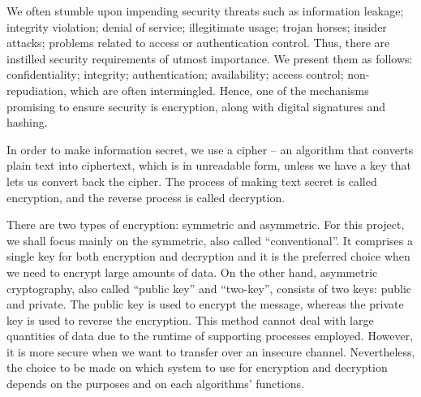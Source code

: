 We often stumble upon impending security threats such as information leakage; integrity violation; denial of service; illegitimate usage; trojan horses; insider attacks; problems related to access or authentication control. 
Thus, there are instilled security requirements of utmost importance. We present them as follows: confidentiality; integrity; authentication; availability; access control; non-repudiation, which are often intermingled. Hence, one of the mechanisms promising to ensure security is encryption, along with digital signatures and hashing. 

In order to make information secret, we use a cipher – an algorithm that converts plain text into ciphertext, which is in unreadable form, unless we have a key that lets us convert back the cipher. The process of making text secret is called encryption, and the reverse process is called decryption.

There are two types of encryption: symmetric and asymmetric. For this project, we shall focus mainly on the symmetric, also called “conventional”. It comprises a single key for both encryption and decryption and it is the preferred choice when we need to encrypt large amounts of data. On the other hand, asymmetric cryptography, also called “public key” and “two-key”, consists of two keys: public and private. The public key is used to encrypt the message, whereas the private key is used to reverse the encryption. This method cannot deal with large quantities of data due to the runtime of supporting processes employed. However, it is more secure when we want to transfer over an insecure channel. Nevertheless, the choice to be made on which system to use for encryption and decryption depends on the purposes and on each algorithms’ functions. 
